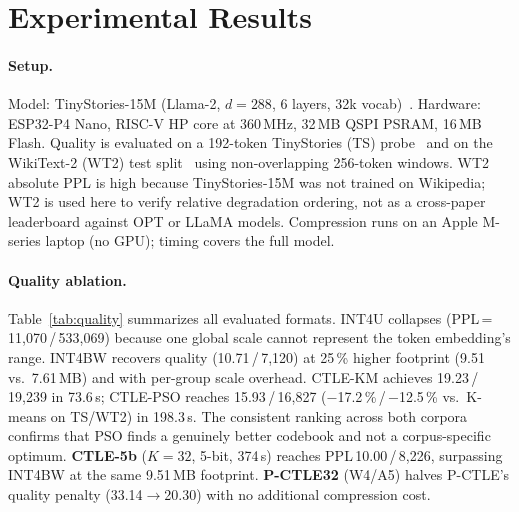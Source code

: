 \documentclass[10pt,journal]{IEEEtran}
\begin{document}
\section{Experimental Results}
\label{sec:results}

\paragraph{Setup.}
Model: TinyStories-15M (Llama-2, $d\!=\!288$, 6 layers, 32k
vocab)~\cite{karpathy2023llama2c}. Hardware: ESP32-P4 Nano, RISC-V HP core at
360\,MHz, 32\,MB QSPI PSRAM, 16\,MB Flash. Quality is evaluated on a 192-token
TinyStories (TS) probe~\cite{eldan2023tinystories} and on the WikiText-2 (WT2)
test split~\cite{merity2016pointer} using non-overlapping 256-token windows.
WT2 absolute PPL is high because TinyStories-15M was not trained on Wikipedia;
WT2 is used here to verify relative degradation ordering, not as a cross-paper
leaderboard against OPT or LLaMA models. Compression runs on an Apple M-series
laptop (no GPU); timing covers the full model.

\paragraph{Quality ablation.}
Table~\ref{tab:quality} summarizes all evaluated formats. INT4U collapses
(PPL\,=\,11{,}070\,/\,533{,}069) because one global scale cannot represent the
token embedding's range. INT4BW recovers quality (10.71\,/\,7{,}120) at 25\,\%
higher footprint (9.51 vs.\ 7.61\,MB) and with per-group scale overhead.
CTLE-KM achieves 19.23\,/\,19{,}239 in 73.6\,s; CTLE-PSO reaches 15.93\,/\,16{,}827
($-$17.2\,\%\,/\,$-$12.5\,\% vs.\ K-means on TS/WT2) in 198.3\,s. The consistent
ranking across both corpora confirms that PSO finds a genuinely better codebook
and not a corpus-specific optimum. \textbf{CTLE-5b} ($K\!=\!32$, 5-bit,
374\,s) reaches PPL\,10.00\,/\,8{,}226, surpassing INT4BW at the same 9.51\,MB
footprint. \textbf{P-CTLE32} (W4/A5) halves P-CTLE's quality penalty
(33.14$\to$20.30) with no additional compression cost.
\end{document}
